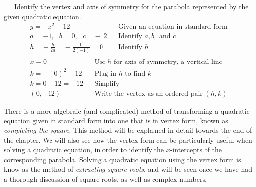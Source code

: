 \begin{example}~~~Identify the vertex and axis of symmetry for the parabola represented by the given quadratic equation.
\begin{eqnarray*}
y=-x^2-12      &  & \text{Given an equation in standard form}\\ 
a=-1,~~~b=0,~~~c=-12       &  & \text{Identify~} a,b, \text{~and~} c\\             
h=-~\frac{b}{2a}=-~\frac{0}{2(-1)}=0 & & \text{Identify~} h\\
\end{eqnarray*}
\begin{eqnarray*}
x=0 & & \text{Use~} h \text{~for~axis~of~symmetry,~a~vertical~line}\\
k= -(0)^2-12   &  & \text{Plug in~} h \text{~to~find~} k\\
k= 0-12= -12  &  &\mathrm{Simplify}\\
(0,-12)    &  & \text{Write the vertex as an ordered pair $(h,k)$}
\end{eqnarray*}
\end{example}
There is a more algebraic (and complicated) method of transforming a quadratic equation given in standard form into one that is in vertex form, known as \textit{completing the square}.  This method will be explained in detail towards the end of the chapter.\pp
We will also see how the vertex form can be particularly useful when solving a quadratic equation, in order to identify the $x$-intercepts of the corresponding parabola.  Solving a quadratic equation using the vertex form is know as the method of \textit{extracting square roots}, and will be seen once we have had a thorough discussion of square roots, as well as complex numbers. 